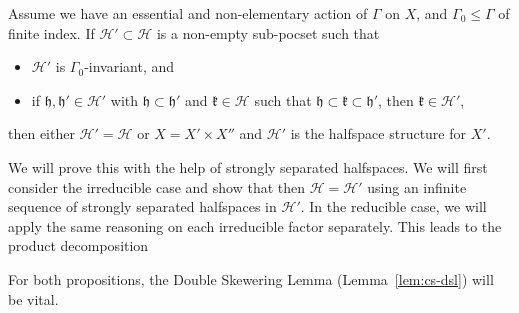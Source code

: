 \begin{prop}
  \label{prop:f-3.32}
  Assume we have an essential and non-elementary action of \(\Gamma\) on \(X\), and \(\Gamma_0 \leq \Gamma\) of finite index. If \(\mathcal{H}' \subset \mathcal{H}\) is a non-empty sub-pocset such that
  \begin{itemize}
  \item \(\mathcal{H}'\) is \(\Gamma_0\)-invariant, and
  \item if \(\mathfrak{h}, \mathfrak{h}' \in \mathcal{H}'\) with \(\mathfrak{h} \subset \mathfrak{h}'\) and \(\mathfrak{k} \in \mathcal{H}\) such that \(\mathfrak{h} \subset \mathfrak{k} \subset \mathfrak{h}'\), then \(\mathfrak{k} \in \mathcal{H}'\),
  \end{itemize}
  then either \(\mathcal{H}' = \mathcal{H}\) or \(X = X' \times X''\) and \(\mathcal{H}'\) is the halfspace structure for \(X'\).
\end{prop}

We will prove this with the help of strongly separated halfspaces. We will first consider the irreducible case and show that then \(\mathcal{H} = \mathcal{H}'\) using an infinite sequence of strongly separated halfspaces in \(\mathcal{H}'\). In the reducible case, we will apply the same reasoning on each irreducible factor separately. This leads to the product decomposition

For both propositions, the Double Skewering Lemma (Lemma~\ref{lem:cs-dsl}) will be vital.





